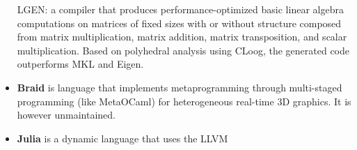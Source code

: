 \documentclass[../main]{subfiles}
\begin{document}
\begin{itemize}
LGEN\cite{hpcs15}:
a compiler that produces performance-optimized
basic linear algebra computations on matrices
of fixed sizes with or without structure composed
from matrix multiplication, matrix addition, matrix
transposition, and scalar multiplication. Based on
polyhedral analysis using CLoog, the generated code
outperforms MKL and Eigen.


\item
\textbf{Braid} \cite{braid} is language that implements metaprogramming
through multi-staged programming (like MetaOCaml) for heterogeneous real-time
3D graphics. It is however unmaintained.

\item
\textbf{Julia} \cite{julia} is a dynamic language that uses the LLVM

\end{itemize}
\end{document}
